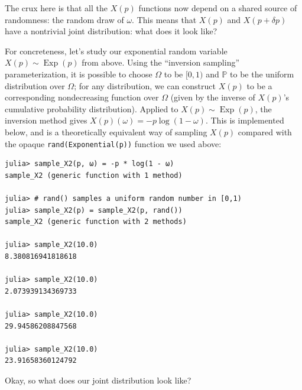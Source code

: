 The crux here is that all the $X(p)$ functions now depend on a shared source of randomness: the random draw of $\omega$.
This means that $X(p)$ and $X(p+\delta p)$ have a nontrivial joint distribution: what does it look like?

For concreteness, let's study our exponential random variable $X(p) \sim \operatorname{Exp}(p)$ from above.  Using the ``inversion sampling'' parameterization,
it is possible to choose $\Omega$ to be $[0,1)$ and $\mathbb{P}$ to be the uniform distribution over
$\Omega$; for any distribution, we can construct $X(p)$ to be a corresponding nondecreasing function over $\Omega$ (given by the inverse of $X(p)$'s cumulative probability distribution). 
Applied to $X(p) \sim \operatorname{Exp}(p)$, the inversion method gives $X(p)(\omega) = -p \log{(1-\omega)}$.  This is implemented below, and is a theoretically equivalent way
of sampling $X(p)$ compared with the opaque \texttt{rand(Exponential(p))} function we used above:
\begin{verbatim}
julia> sample_X2(p, ω) = -p * log(1 - ω)
sample_X2 (generic function with 1 method)

julia> # rand() samples a uniform random number in [0,1)
julia> sample_X2(p) = sample_X2(p, rand()) 
sample_X2 (generic function with 2 methods)

julia> sample_X2(10.0)
8.380816941818618

julia> sample_X2(10.0)
2.073939134369733

julia> sample_X2(10.0)
29.94586208847568

julia> sample_X2(10.0)
23.91658360124792
\end{verbatim}
Okay, so what does our joint distribution look like?
